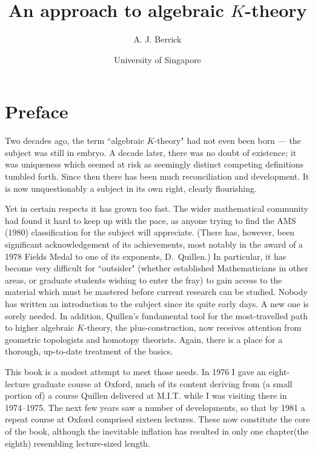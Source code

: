 \documentclass[openany,leqno]{book}  %
\begin{document}
\title{An approach to algebraic $K$-theory}

\author{A. J. Berrick}
\date{University of Singapore}

\maketitle

\chapter*{Preface}
\label{cha:0preface}
Two decades ago, the term ``algebraic $K$-theory" had not even been born --- the subject was still in embryo. A decade later, there was no doubt of existence; it was uniqueness which seemed at risk as seemingly distinct competing definitions tumbled forth. Since then there has been much reconciliation and development. It is now unquestionably a subject in its own right, clearly flourishing.  

Yet in certain respects it has grown too fast. The wider mathematical community had found it hard to keep up with the pace, as anyone trying to find the AMS (1980) classification for the subject will appreciate. (There has, however, been significant acknowledgement of its achievements, most notably in the award of a 1978 Fields Medal to one of its exponents, D.~Quillen.) In particular,  it has become very difficult for ``outsider" (whether established Mathematicians in other areas, or graduate students wishing to enter the fray) to gain access to the material which must be mastered before current research can be studied. Nobody has written an introduction to the subject since its quite early days. A new one is sorely needed. In addition, Quillen's fundamental tool for the most-travelled path to higher algebraic $K$-theory, the plus-construction, now receives attention from geometric topologists and homotopy theorists. Again, there is a place for a thorough, up-to-date treatment of the basics. 

This book is a modest attempt to meet those needs. In 1976 I gave an eight-lecture graduate course at Oxford, much of its content deriving from (a small portion of) a course Quillen delivered at M.I.T. while I was visiting there in 1974--1975. The next few years saw a number of developments, so that by 1981 a repeat course at Oxford comprised sixteen lectures. These now constitute the core of the book, although the inevitable inflation has resulted in only one chapter(the eighth) resembling lecture-sized length. 
\end{document}
